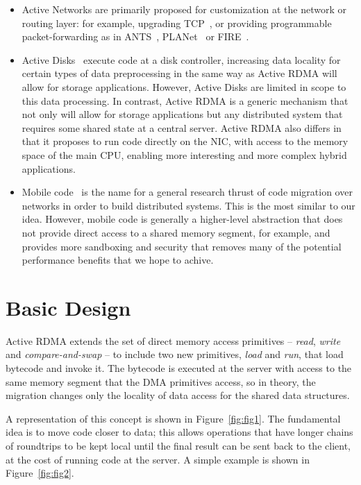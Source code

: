 \documentclass[10pt]{article}
\begin{document}
\begin{itemize} \itemsep -2pt

\item Active Networks are primarily proposed for customization at the
  network or routing layer: for example, upgrading TCP~\cite{AN-tcp},
  or providing programmable packet-forwarding as in ANTS~\cite{ANTS},
  PLANet~\cite{planet} or FIRE~\cite{FIRE}.

\item Active Disks~\cite{AD2,AD} execute code at a disk controller,
  increasing data locality for certain types of data preprocessing in
  the same way as Active RDMA will allow for storage applications.
  However, Active Disks are limited in scope to this data processing.
  In contrast, Active RDMA is a generic mechanism that not only will
  allow for storage applications but any distributed system that
  requires some shared state at a central server. Active RDMA also
  differs in that it proposes to run code directly on the NIC, with
  access to the memory space of the main CPU, enabling more
  interesting and more complex hybrid applications.

\item Mobile code~\cite{mobile} is the name for a general research
  thrust of code migration over networks in order to build distributed
  systems. This is the most similar to our idea. However, mobile code
  is generally a higher-level abstraction that does not provide direct
  access to a shared memory segment, for example, and provides more
  sandboxing and security that removes many of the potential
  performance benefits that we hope to achive.

\end{itemize}

\section{Basic Design}

Active RDMA extends the set of direct memory access primitives --
\emph{read}, \emph{write} and \emph{compare-and-swap} -- to include
two new primitives, \emph{load} and \emph{run}, that load bytecode and
invoke it. The bytecode is executed at the server with access to the
same memory segment that the DMA primitives access, so in theory, the
migration changes only the locality of data access for the shared data
structures.

A representation of this concept is shown in
Figure~\ref{fig:fig1}. The fundamental idea is to move code closer to
data; this allows operations that have longer chains of roundtrips to
be kept local until the final result can be sent back to the client,
at the cost of running code at the server. A simple example is shown
in Figure~\ref{fig:fig2}.
\end{document}
